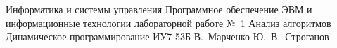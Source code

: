 \makereporttitle
    {Информатика и системы управления}
    {Программное обеспечение ЭВМ и информационные технологии}
    {лабораторной работе №~1}
    {Анализ алгоритмов}
    {Динамическое программирование}
    {}
    {ИУ7-53Б}
    {В.~Марченко}
    {Ю.~В.~Строганов}
    {}
